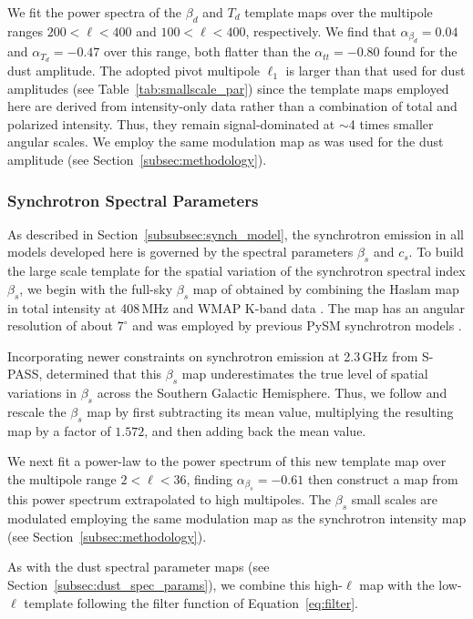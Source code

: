 \documentclass[twocolumn]{aastex631}
\begin{document}
We fit the power spectra of the $\beta_d$ and $T_d$ template maps over the multipole ranges $200 < \ell < 400$ and $100 < \ell < 400$, respectively. We find that $\alpha_{\beta_d}= 0.04$ and $\alpha_{T_d} = -0.47$ over this range, both flatter than the $\alpha_{tt} = -0.80$ found for the dust amplitude. The adopted pivot multipole $\ell_1$ is larger than that used for dust amplitudes (see Table~\ref{tab:smallscale_par}) since the template maps employed here are derived from intensity-only data rather than a combination of total and polarized intensity. Thus, they remain signal-dominated at $\sim$4 times smaller angular scales. We employ the same modulation map as was used for the dust amplitude (see Section~\ref{subsec:methodology}).

\subsubsection{Synchrotron Spectral Parameters}\label{sec:beta_s}
As described in Section~\ref{subsubsec:synch_model}, the synchrotron emission in all models developed here is governed by the spectral parameters $\beta_s$ and $c_s$. To build the large scale template for the spatial variation of the synchrotron spectral index $\beta_s$, we begin with the full-sky $\beta_s$ map of \citet{Miville-Deschenes:2008} obtained by combining the Haslam map in total intensity at 408\,MHz \citep{Remazeilles:2015} and WMAP K-band data \citep{Bennett:2013}. The map has an angular resolution of about $7^{\circ}$ and was employed by previous PySM synchrotron models \citep{Thorne:2017}.

Incorporating newer constraints on synchrotron emission at 2.3\,GHz from S-PASS, \citet{Krachmalnicoff:2018} determined that this $\beta_s$ map underestimates the true level of spatial variations in $\beta_s$ across the Southern Galactic Hemisphere. Thus, we follow \citet{Krachmalnicoff:2018} and rescale the $\beta_s$ map by first subtracting its mean value, multiplying the resulting map by a factor of $1.572$, and then adding back the mean value.

We next fit a power-law to the power spectrum of this new template map over the multipole range $2<\ell<36$, finding $\alpha_{\beta_s}=-0.61$ then construct a map from this power spectrum extrapolated to high multipoles. The $\beta_s$ small scales are modulated employing the same modulation map as the synchrotron intensity map (see Section~\ref{subsec:methodology}). 

As with the dust spectral parameter maps (see Section~\ref{subsec:dust_spec_params}), we combine this high-$\ell$ map with the low-$\ell$ template following the filter function of Equation~\ref{eq:filter}.
 
\end{document}

